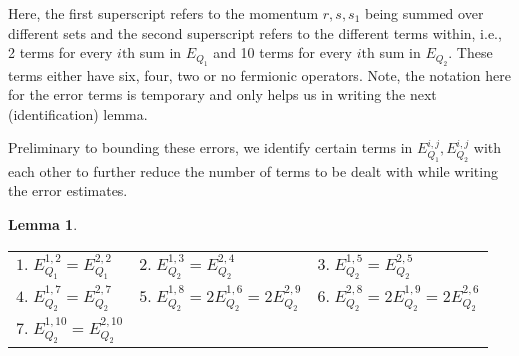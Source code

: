 \documentclass[sn-mathphys, Numbered ,a4paper]{sn-jnl}%
\theoremstyle{plain}
\newtheorem{lemma}[theorem]{Lemma}
\theoremstyle{definition}
\theoremstyle{remark}
\theoremstyle{plain}
\theoremstyle{definition}
\theoremstyle{remark}
\begin{document}
Here, the first superscript refers to the momentum $r,s,s_1$ being summed over different sets and the second superscript refers to the different terms within, i.e., 2 terms for every $i\mathrm{th}$ sum in $E_{Q_1}$ and 10 terms for every $i\mathrm{th}$ sum in $E_{Q_2}$. These terms either have six, four, two or no fermionic operators. Note, the notation here for the error terms is temporary and only helps us in writing the next (identification) lemma.

Preliminary to bounding these errors, we identify certain terms in $E_{Q_1}^{i,j}, E_{Q_2}^{i,j}$ with each other to further reduce the number of terms to be dealt with while writing the error estimates.

\begin{lemma}
{\renewcommand{\arraystretch}{1.5}
	\begin{tabular}[t]{lll}
		 $\mathit{1.}\; E_{Q_1}^{1,2} = E_{Q_1}^{2,2}$\quad\quad& 
		 $\mathit{2.}\; E_{Q_2}^{1,3} = E_{Q_2}^{2,4}$\quad\quad&
		 $\mathit{3.}\; E_{Q_2}^{1,5} = E_{Q_2}^{2,5}$ \quad\quad\\
		 $\mathit{4.}\; E_{Q_2}^{1,7} = E_{Q_2}^{2,7}$\quad\quad&
		 $\mathit{5.}\; E_{Q_2}^{1,8} = 2E_{Q_2}^{1,6} =  2E_{Q_2}^{2,9}$\quad\quad&
		 $\mathit{6.}\; E_{Q_2}^{2,8} = 2E_{Q_2}^{1,9} = 2E_{Q_2}^{2,6}$\quad\quad\\
		 $\mathit{7.}\; E_{Q_2}^{1,10} = E_{Q_2}^{2,10}$\quad\quad
		 
\end{tabular}}
\end{lemma}	 
\end{document}
